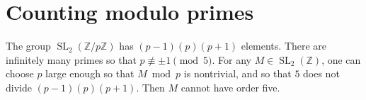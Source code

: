 \documentclass{article}
\DeclareMathOperator{\SL}{SL}
\newcommand{\Z}{\mathbb{Z}}
\begin{document}
\section*{Counting modulo primes}

The group $\SL_2(\Z/p\Z)$ has $(p-1)(p)(p+1)$ elements.  There are
infinitely many primes so that $p \not\equiv \pm 1 \pmod 5$.  For any
$M \in \SL_2(\Z)$, one can choose $p$ large enough so that $M \bmod p$
is nontrivial, and so that $5$ does not divide $(p-1)(p)(p+1)$.  Then
$M$ cannot have order five.
\end{document}
